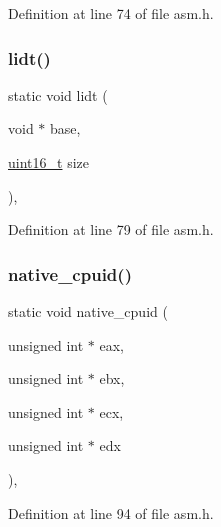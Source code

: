 Definition at line 74 of file asm.\+h.

\mbox{\label{a00014_a31967dec32575d3d398e6d289e888d1f_a31967dec32575d3d398e6d289e888d1f}} 
\subsubsection{\texorpdfstring{lidt()}{lidt()}}
{\footnotesize\ttfamily static void lidt (\begin{DoxyParamCaption}\item[{void $\ast$}]{base,  }\item[{\hyperlink{a00038_adf4d876453337156dde61095e1f20223_adf4d876453337156dde61095e1f20223}{uint16\+\_\+t}}]{size }\end{DoxyParamCaption})\hspace{0.3cm}{\ttfamily [inline]}, {\ttfamily [static]}}



Definition at line 79 of file asm.\+h.

\mbox{\label{a00014_a3e1ee5b4e7cf5886c073da5f5f1b74eb_a3e1ee5b4e7cf5886c073da5f5f1b74eb}} 
\subsubsection{\texorpdfstring{native\+\_\+cpuid()}{native\_cpuid()}}
{\footnotesize\ttfamily static void native\+\_\+cpuid (\begin{DoxyParamCaption}\item[{unsigned int $\ast$}]{eax,  }\item[{unsigned int $\ast$}]{ebx,  }\item[{unsigned int $\ast$}]{ecx,  }\item[{unsigned int $\ast$}]{edx }\end{DoxyParamCaption})\hspace{0.3cm}{\ttfamily [inline]}, {\ttfamily [static]}}



Definition at line 94 of file asm.\+h.

\mbox{\label{a00014_aa37f5841c54156a4b14fc0d6f626b44f_aa37f5841c54156a4b14fc0d6f626b44f}} 
